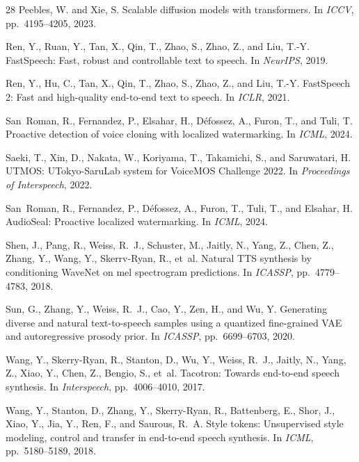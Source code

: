 \documentclass[11pt,a4paper]{article}
\begin{document}
\begin{thebibliography}{28}
Peebles, W. and Xie, S.
\newblock Scalable diffusion models with transformers.
\newblock In \emph{ICCV}, pp.\ 4195--4205, 2023.

Ren, Y., Ruan, Y., Tan, X., Qin, T., Zhao, S., Zhao, Z., and Liu, T.-Y.
\newblock FastSpeech: Fast, robust and controllable text to speech.
\newblock In \emph{NeurIPS}, 2019.

Ren, Y., Hu, C., Tan, X., Qin, T., Zhao, S., Zhao, Z., and Liu, T.-Y.
\newblock FastSpeech 2: Fast and high-quality end-to-end text to speech.
\newblock In \emph{ICLR}, 2021.

San~Roman, R., Fernandez, P., Elsahar, H., D{\'e}fossez, A., Furon, T., and Tuli, T.
\newblock Proactive detection of voice cloning with localized watermarking.
\newblock In \emph{ICML}, 2024.

Saeki, T., Xin, D., Nakata, W., Koriyama, T., Takamichi, S., and Saruwatari, H.
\newblock UTMOS: UTokyo-SaruLab system for VoiceMOS Challenge 2022.
\newblock In \emph{Proceedings of Interspeech}, 2022.

San~Roman, R., Fernandez, P., D{\'e}fossez, A., Furon, T., Tuli, T., and Elsahar, H.
\newblock AudioSeal: Proactive localized watermarking.
\newblock In \emph{ICML}, 2024.

Shen, J., Pang, R., Weiss, R.~J., Schuster, M., Jaitly, N., Yang, Z., Chen, Z., Zhang, Y., Wang, Y., Skerrv-Ryan, R., et~al.
\newblock Natural TTS synthesis by conditioning WaveNet on mel spectrogram predictions.
\newblock In \emph{ICASSP}, pp.\ 4779--4783, 2018.

Sun, G., Zhang, Y., Weiss, R.~J., Cao, Y., Zen, H., and Wu, Y.
\newblock Generating diverse and natural text-to-speech samples using a quantized fine-grained VAE and autoregressive prosody prior.
\newblock In \emph{ICASSP}, pp.\ 6699--6703, 2020.

Wang, Y., Skerry-Ryan, R., Stanton, D., Wu, Y., Weiss, R.~J., Jaitly, N., Yang, Z., Xiao, Y., Chen, Z., Bengio, S., et~al.
\newblock Tacotron: Towards end-to-end speech synthesis.
\newblock In \emph{Interspeech}, pp.\ 4006--4010, 2017.

Wang, Y., Stanton, D., Zhang, Y., Skerry-Ryan, R., Battenberg, E., Shor, J., Xiao, Y., Jia, Y., Ren, F., and Saurous, R.~A.
\newblock Style tokens: Unsupervised style modeling, control and transfer in end-to-end speech synthesis.
\newblock In \emph{ICML}, pp.\ 5180--5189, 2018.


\end{thebibliography}
\end{document}
